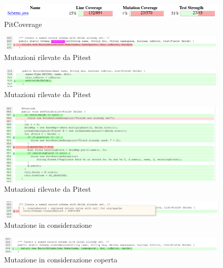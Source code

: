 \documentclass[12pt, a4paper]{article}
\begin{document}
  \begin{figure}
    \includegraphics[width=\linewidth]{./images/create_record/PitCoverage1.png}
    \caption{PitCoverage}
    \label{fig:PitCoverageCreateRecord1}
  \end{figure}

  \begin{figure}
    \includegraphics[width=\linewidth]{./images/create_record/PitCoverage2.png}
    \caption{Mutazioni rilevate da Pitest}
    \label{fig:PitCoverageCreateRecord2}
  \end{figure}

  \begin{figure}
    \includegraphics[width=\linewidth]{./images/create_record/PitCoverage3.png}
    \caption{Mutazioni rilevate da Pitest}
    \label{fig:PitMutationCreateRecord3}
  \end{figure}

  \begin{figure}
    \includegraphics[width=\linewidth]{./images/create_record/PitCoverage4.png}
    \caption{Mutazioni rilevate da Pitest}
    \label{fig:PitMutationCreateRecord4}
  \end{figure}

  \begin{figure}
    \includegraphics[width=\linewidth]{./images/create_record/PitCoverage5.png}
    \caption{Mutazione in considerazione}
    \label{fig:PitMutationCreateRecord5}
  \end{figure}

  \begin{figure}
    \includegraphics[width=\linewidth]{./images/create_record/PitCoverage6.png}
    \caption{Mutazione in considerazione coperta}
    \label{fig:PitMutationCreateRecord6}
  \end{figure}
\end{document}
